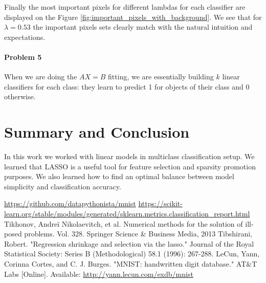 \documentclass{article}
\begin{document}
 Finally the most important pixels for different lambdas for each classifier are displayed on the Figure \ref{fig:important_pixels_with_background}. We see that for $\lambda = 0.53$ the important pixels sets clearly match with the natural intuition and expectations.
 
 \paragraph{Problem 5} When we are doing the $AX=B$ fitting, we are essentially building $k$ linear classifiers for each class: they learn to predict 1 for objects of their class and 0 otherwise.
    
    
    
\section{Summary and Conclusion}
In this work we worked with linear models in multiclass classification setup. We learned that LASSO is a useful tool for feature selection and sparsity promotion purposes. We also learned how to find an optimal balance between model simplicity and classification accuracy.  


\begin{thebibliography}{99}

 \url{https://github.com/datapythonista/mnist}
 \url{https://scikit-learn.org/stable/modules/generated/sklearn.metrics.classification_report.html}
Tikhonov, Andreï Nikolaevitch, et al. Numerical methods for the solution of ill-posed problems. Vol. 328. Springer Science \& Business Media, 2013
Tibshirani, Robert. "Regression shrinkage and selection via the lasso." Journal of the Royal Statistical Society: Series B (Methodological) 58.1 (1996): 267-288.
LeCun, Yann, Corinna Cortes, and C. J. Burges. "MNIST: handwritten digit database." AT\&T Labs [Online]. Available: \url{http://yann.lecun.com/exdb/mnist}
\end{thebibliography}

\newpage
\end{document}
